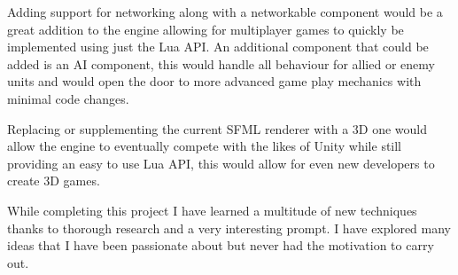 \documentclass[11pt,a4paper,titlepage]{report}
\begin{document}
	Adding support for networking along with a networkable component would be a great addition to the engine allowing for multiplayer games to quickly be implemented using just the Lua API. An additional component that could be added is an AI component, this would handle all behaviour for allied or enemy units and would open the door to more advanced game play mechanics with minimal code changes.

	Replacing or supplementing the current SFML renderer with a 3D one would allow the engine to eventually compete with the likes of Unity while still providing an easy to use Lua API, this would allow for even new developers to create 3D games.


	While completing this project I have learned a multitude of new techniques thanks to thorough research and a very interesting prompt. I have explored many ideas that I have been passionate about but never had the motivation to carry out.

	\newpage

	\singlespacing
	\printbibliography{}
	\onehalfspacing
\end{document}
